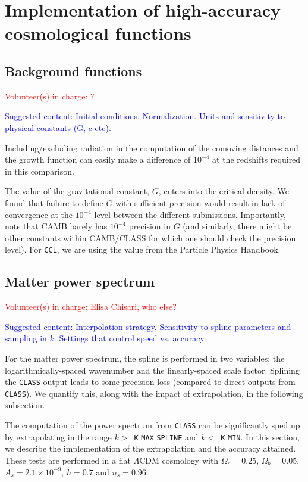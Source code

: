 \documentclass[\docopts]{\docclass}
\newcommand{\vol}[1]{\textcolor{red}{Volunteer(s) in charge: #1}}
\newcommand{\cont}[1]{\textcolor{blue}{Suggested content: #1}}
\newcommand{\ccl}{{\tt CCL}\xspace}
\begin{document}
\section{Implementation of high-accuracy cosmological functions}

\subsection{Background functions}
\vol{?}

\cont{Initial conditions. Normalization. Units and sensitivity to physical constants (G, c etc).}

Including/excluding radiation in the computation of the comoving distances and the growth function can easily make a difference of $10^{-4}$ at the redshifts required in this comparison.

The value of the gravitational constant, $G$, enters into the critical density. We found that failure to define $G$ with sufficient precision would result in lack of convergence at the $10^{-4}$ level between the different submissions. Importantly, note that CAMB barely has $10^{-4}$ precision in $G$ (and similarly, there might be other constants within CAMB/CLASS for which one should check the precision level). For \ccl, we are using the value from the Particle Physics Handbook.

\subsection{Matter power spectrum}
\vol{Elisa Chisari, who else?}

\cont{Interpolation strategy. Sensitivity to spline parameters and sampling in $k$. Settings that control speed vs. accuracy. }

For the matter power spectrum, the spline is performed in two variables: the logarithmically-spaced wavenumber and the linearly-spaced scale factor. Splining the {\tt CLASS} output leads to some precision loss (compared to direct outputs from {\tt CLASS}). We quantify this, along with the impact of extrapolation, in the following subsection.

The computation of the power spectrum from {\tt CLASS} can be significantly sped up by extrapolating in the range $k>$~{\tt K$\_$MAX$\_$SPLINE} and $k<$~{\tt K$\_$MIN}. In this section, we describe the implementation of the extrapolation and the accuracy attained. These tests are performed in a flat $\Lambda$CDM cosmology with $\Omega_c=0.25$, $\Omega_b=0.05$, $A_s=2.1\times10^{-9}$, $h=0.7$ and $n_s=0.96$.
\end{document}
